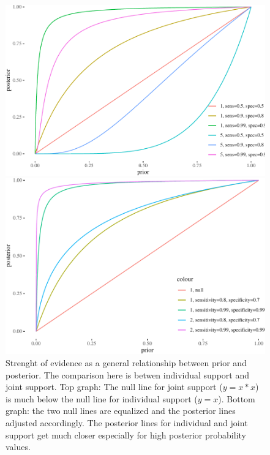 \documentclass[10pt,dvipsnames,enabledeprecatedfontcommands]{scrartcl}
\begin{document}
\begin{figure}


\begin{center}\includegraphics[width=0.9\linewidth]{conjunction-paradox_files/figure-latex/unnamed-chunk-14-1} \end{center}


\begin{center}\includegraphics[width=0.9\linewidth]{conjunction-paradox_files/figure-latex/unnamed-chunk-15-1} \end{center}

\caption{Strenght of evidence as a general relationship between prior 
and posterior. The comparison here is betwen individual support and joint support. 
Top graph: The null line for joint support ($y=x*x$) is 
much below the null line for individual support ($y=x$).
Bottom graph: the two null lines are equalized and the 
posterior lines adjusted accordingly. The posterior lines for individual 
and joint support get much closer especially for 
high posterior probability values.}
\label{fig:strength-indiv-joint}
\end{figure}
\end{document}
